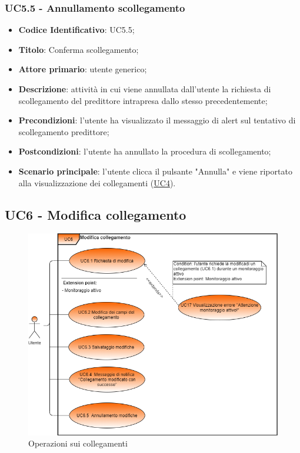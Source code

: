 \label{par:UC5.5}
	\subsubsection{UC5.5 - Annullamento scollegamento}
		\begin{itemize}
			\item\textbf{Codice Identificativo}: UC5.5;
			\item\textbf{Titolo}: Conferma scollegamento;
			\item\textbf{Attore primario}: utente generico;
			\item\textbf{Descrizione}: attività in cui viene annullata dall'utente la richiesta di scollegamento del predittore intrapresa dallo stesso precedentemente;
			\item\textbf{Precondizioni}: l'utente ha visualizzato il messaggio di alert sul tentativo di scollegamento predittore;
			\item\textbf{Postcondizioni}: l'utente ha annullato la procedura di scollegamento;	
			\item\textbf{Scenario principale}: l'utente clicca il pulsante "Annulla" e viene riportato alla visualizzazione dei collegamenti (\hyperref[par:UC4]{UC4}).
			\end{itemize}
			
		
	\label{par:UC6}
	\subsection{UC6 - Modifica collegamento}
	
\begin{figure}[H]
		\centering
		\includegraphics[scale=0.70]{../Analisi_dei_requisiti/img/Diagrammi_UML/UC6_modifica_collegamento.png}
		\caption{Operazioni sui collegamenti} 
		\end{figure}	


